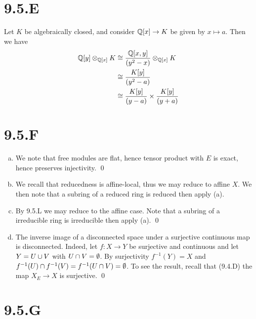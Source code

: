 \documentclass{article}
\begin{document}
\section{9.5.E}
Let $K$ be algebraically closed, and consider
$\mathbb{Q}[x] \to K$ be given by $x \mapsto a$. Then we have
\begin{align*}
    \mathbb{Q}[y] \otimes_{\mathbb{Q}[x]} K & \cong \frac{\mathbb{Q}[x, y]}{(y^2-x)} \otimes_{\mathbb{Q}[x]} K   \\
                            & \cong \frac{K[y]}{(y^2-a)}                         \\
                            & \cong \frac{K[y]}{(y-a)} \times \frac{K[y]}{(y+a)}
\end{align*}

\section{9.5.F}
\begin{enumerate}[a.]
    \item We note that free modules are flat, hence tensor product with
          $E$ is exact, hence preserves injectivity. \qed
    \item We recall that reducedness is affine-local, thus we may reduce to affine
          $X$. We then note that a subring of a reduced ring is reduced
          then apply (a).
    \item By 9.5.L we may reduce to the affine case. Note that a subring of a irreducible
          ring is irreducible then apply (a). \qed
    \item The inverse image of a disconnected space under a surjective continuous map is
          disconnected. Indeed, let $f: X \to Y$ be surjective and continuous
          and let $Y=U \cup V$ with $U \cap V = \emptyset$. By surjectivity
          $f^{-1}(Y)=X$ and $f^{-1}(U) \cap
              f^{-1}(V)=f^{-1}(U \cap V) = \emptyset$. To see the result, recall that
          (9.4.D) the map $X_E \to X$ is surjective. \qed
\end{enumerate}

\section{9.5.G}
\end{document}
